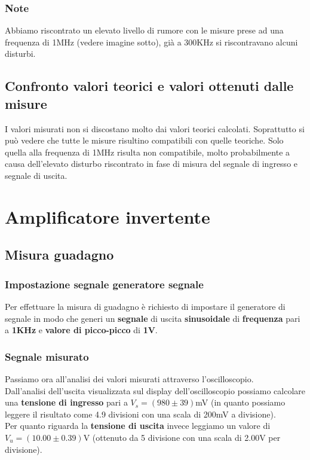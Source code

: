 \documentclass{article}
\begin{document}
\subsubsection{Note}
Abbiamo riscontrato un elevato livello di rumore con le misure prese ad una frequenza di 1MHz (vedere imagine sotto), già a 300KHz si riscontravano alcuni disturbi.

\subsection{Confronto valori teorici e valori ottenuti dalle misure}
I valori misurati non si discostano molto dai valori teorici calcolati. Soprattutto si può vedere che tutte le misure risultino compatibili con quelle teoriche. Solo quella alla frequenza di 1MHz risulta non compatibile, molto probabilmente a causa dell'elevato disturbo riscontrato in fase di misura del segnale di ingresso e segnale di uscita.

\section{Amplificatore invertente}
\normalsize
\subsection{Misura guadagno}
\subsubsection{Impostazione segnale generatore segnale}
Per effettuare la misura di guadagno è richiesto di impostare il generatore di segnale in modo che generi un \textbf{segnale} di uscita \textbf{sinusoidale} di \textbf{frequenza} pari a \textbf{1KHz} e \textbf{valore di picco-picco} di \textbf{1V}.

\subsubsection{Segnale misurato}
Passiamo ora all'analisi dei valori misurati attraverso l'oscilloscopio.\\Dall'analisi dell'uscita visualizzata sul display dell'oscilloscopio possiamo calcolare una \textbf{tensione di ingresso} pari a \large $V_s = (980 \pm 39)$mV \normalsize (in quanto possiamo leggere il risultato come 4.9 divisioni con una scala di 200mV a divisione).\\
Per quanto riguarda la \textbf{tensione di uscita} invece leggiamo un valore di \large $V_u = (10.00 \pm 0.39)$V \normalsize (ottenuto da 5 divisione con una scala di 2.00V per divisione).
\end{document}
